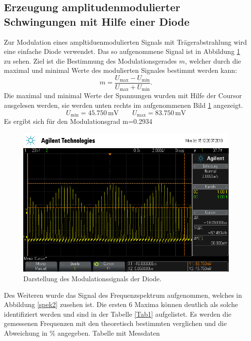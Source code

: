 \subsection{Erzeugung amplitudenmodulierter Schwingungen mit Hilfe einer Diode}
Zur Modulation eines ampltiduenmodulierten Signals mit Trägerabstrahlung wird eine
einfache Diode verwendet. Das so aufgenommene Signal ist in Abbildung
\ref{fig:plot2} zu sehen.
Ziel ist die Bestimmung des Modulationsgerades $m$, welcher durch die
maximal und minimal Werte des modulierten Signales bestimmt werden kann:
\begin{equation}
m=\frac{U_\text{max}-U_\text{min}}{U_\text{max}+U_\text{min}}.
\end{equation}
Die maximal und minimal Werte der Spannungen wurden mit Hilfe der Coursor
ausgelesen werden, sie werden unten rechts im aufgenommenen Bild \ref{fig:plot2}
angezeigt.
\begin{equation}
    U_\text{min}=45.750\,\text{mV} \quad \quad
    U_\text{max}=83.750\,\text{mV}
\end{equation}
Es ergibt sich für den Modulationsgrad m=0.2934
\begin{figure}
  \centering
  \includegraphics[width=0.7\linewidth]{ressources/scope_453.png}
  \caption{Darstellung des Modulationssignals der Diode.}
  \label{fig:plot2}
\end{figure}
Des Weiteren wurde das Signal des Frequenzspektrum aufgenommen, welches in
Abbildung \ref{spek2} zusehen ist. Die ersten 6 Maxima können deutlich als
solche identifiziert werden und sind in der Tabelle \ref{Tab1} aufgelistet.
Es werden die gemessenen Frequenzen mit den theoretisch bestimmten verglichen
und die Abweichung in $\%$  angegeben.
Tabelle mit Messdaten
